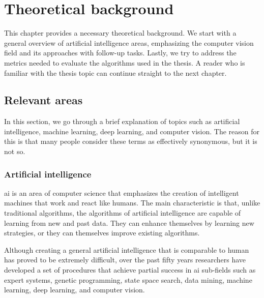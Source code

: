 \chapter{Theoretical background}
    This chapter provides a necessary theoretical background. We start with a general overview of artificial intelligence areas, emphasizing the computer vision field and its approaches with follow-up tasks. Lastly, we try to address the metrics needed to evaluate the algorithms used in the thesis. A reader who is familiar with the thesis topic can continue straight to the next chapter.

\section{Relevant areas}
    In this section, we go through a brief explanation of topics such as artificial intelligence, machine learning, deep learning, and computer vision. The reason for this is that many people consider these terms as effectively synonymous, but it is not so.
    
    \subsection{Artificial intelligence}
        \Gls{ai} is an area of computer science that emphasizes the creation of intelligent machines that work and react like humans. The main characteristic is that, unlike traditional algorithms, the algorithms of artificial intelligence are capable of learning from new and past data. They can enhance themselves by learning new strategies, or they can themselves improve existing algorithms.
        
        Although creating a general artificial intelligence that is comparable to human has proved to be extremely difficult, over the past fifty years researchers have developed a set of procedures that achieve partial success in \gls{ai} sub-fields such as expert systems, genetic programming, state space search, data mining, machine learning, deep learning, and computer vision.
    
